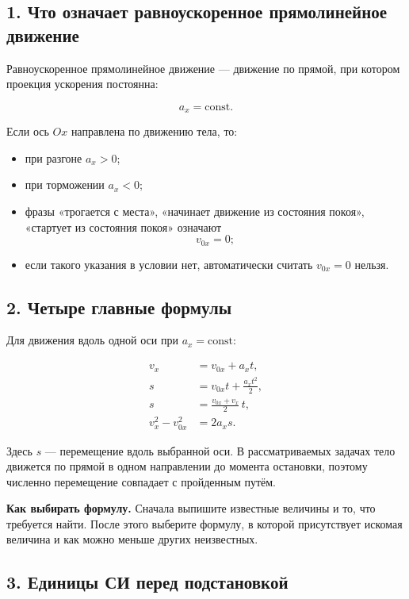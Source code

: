 \documentclass[a4paper,12pt]{article}
\newcommand{\important}[1]{\textcolor{darkaccent}{\textbf{#1}}}
\begin{document}
\subsection*{1. Что означает равноускоренное прямолинейное движение}

Равноускоренное прямолинейное движение --- движение по прямой,
при котором проекция ускорения постоянна:

\[
a_x=\text{const}.
\]

Если ось $Ox$ направлена по движению тела, то:

\begin{itemize}
  \item при разгоне $a_x>0$;
  \item при торможении $a_x<0$;
  \item фразы
  «трогается с места»,
  «начинает движение из состояния покоя»,
  «стартует из состояния покоя»
  означают
  \[
  v_{0x}=0;
  \]
  \item если такого указания в условии нет, автоматически считать
  $v_{0x}=0$ нельзя.
\end{itemize}

\subsection*{2. Четыре главные формулы}

Для движения вдоль одной оси при $a_x=\text{const}$:

\begin{align*}
v_x &= v_{0x}+a_xt,\\[2mm]
s &= v_{0x}t+\frac{a_xt^2}{2},\\[2mm]
s &= \frac{v_{0x}+v_x}{2}\,t,\\[2mm]
v_x^2-v_{0x}^2 &= 2a_xs.
\end{align*}

Здесь $s$ --- перемещение вдоль выбранной оси.
В рассматриваемых задачах тело движется по прямой в одном направлении
до момента остановки, поэтому численно перемещение совпадает
с пройденным путём.

\important{Как выбирать формулу.}
Сначала выпишите известные величины и то, что требуется найти.
После этого выберите формулу, в которой присутствует искомая величина
и как можно меньше других неизвестных.

\subsection*{3. Единицы СИ перед подстановкой}
\end{document}
